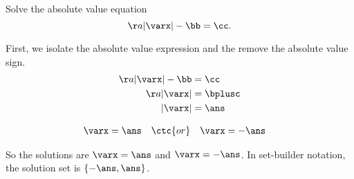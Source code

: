 

\edef\varx{\varx}






\pgfmathtruncatemacro{\cc}{\aa*\ans-\bb}


\pgfmathtruncatemacro{\bplusc}{\cc+\bb}




Solve the absolute value equation 
\[ \aa|\varx| - \bb  = \cc .\]

\begin{solution}
First, we isolate the absolute value expression and the remove the absolute value sign.
\[
\begin{split}
\aa|\varx| - \bb  &= \cc\\
\aa|\varx|  &= \bplusc\\
|\varx| &=\ans
\end{split}
\]

\begin{center}
	\begin{alignat*}{3}
		\varx&=\ans &&\ctc{ or } & \varx&=-\ans
	\end{alignat*}
\end{center} 
So the solutions are $\varx=\ans$ and $\varx=-\ans$.  In set-builder notation, the solution set is 
$\{-\ans, \ans\}$.
\end{solution}

